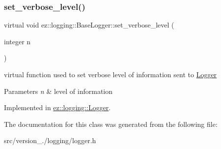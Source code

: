 \subsubsection{\texorpdfstring{set\+\_\+verbose\+\_\+level()}{set\_verbose\_level()}}
{\footnotesize\ttfamily virtual void ez\+::logging\+::\+Base\+Logger\+::set\+\_\+verbose\+\_\+level (\begin{DoxyParamCaption}\item[{integer}]{n }\end{DoxyParamCaption})\hspace{0.3cm}{\ttfamily [pure virtual]}}

virtual function used to set verbose level of information sent to \hyperlink{classez_1_1logging_1_1Logger}{Logger} 
\begin{DoxyParams}{Parameters}
{\em n} & level of information \\
\hline
\end{DoxyParams}


Implemented in \hyperlink{classez_1_1logging_1_1Logger_ae9fd25392d4dc7611acafd335bfe5f94}{ez\+::logging\+::\+Logger}.



The documentation for this class was generated from the following file\+:\begin{DoxyCompactItemize}
\item 
src/version\+\_./logging/logger.\+h\end{DoxyCompactItemize}
